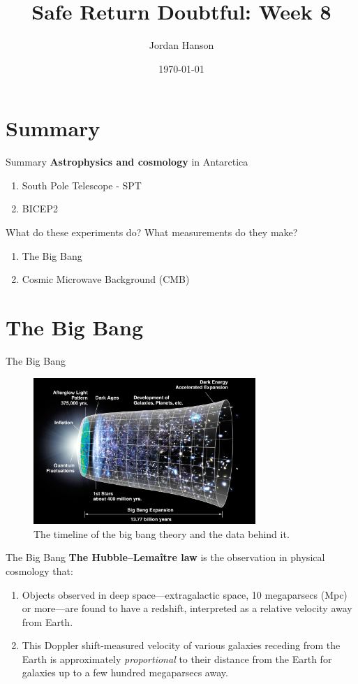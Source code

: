 \documentclass{beamer}
\title{Safe Return Doubtful: Week 8}
\date{\today}
\author{Jordan Hanson}
\institute{Whittier College Department of Physics and Astronomy}
\begin{document}
\maketitle

\section{Summary}

\begin{frame}{Summary}
\textbf{Astrophysics and cosmology} in Antarctica
\begin{enumerate}
\item South Pole Telescope - SPT
\item BICEP2
\end{enumerate}
What do these experiments do?  What measurements do they make?
\begin{enumerate}
\item The Big Bang
\item Cosmic Microwave Background (CMB)
\end{enumerate}
\end{frame}

\section{The Big Bang}

\begin{frame}{The Big Bang}
\begin{figure}
\centering
\includegraphics[width=0.75\textwidth]{CMB.jpg}
\caption{\label{fig:cmb} The timeline of the big bang theory and the data behind it.}
\end{figure}
\end{frame}

\begin{frame}{The Big Bang}
\textbf{The Hubble–Lema\^itre law} is the observation in physical cosmology that:
\begin{enumerate}
\item Objects observed in deep space—extragalactic space, 10 megaparsecs (Mpc) or more—are found to have a redshift, interpreted as a relative velocity away from Earth.
\item This Doppler shift-measured velocity of various galaxies receding from the Earth is approximately \textit{proportional} to their distance from the Earth for galaxies up to a few hundred megaparsecs away.
\end{enumerate}
\end{frame}
\end{document}
